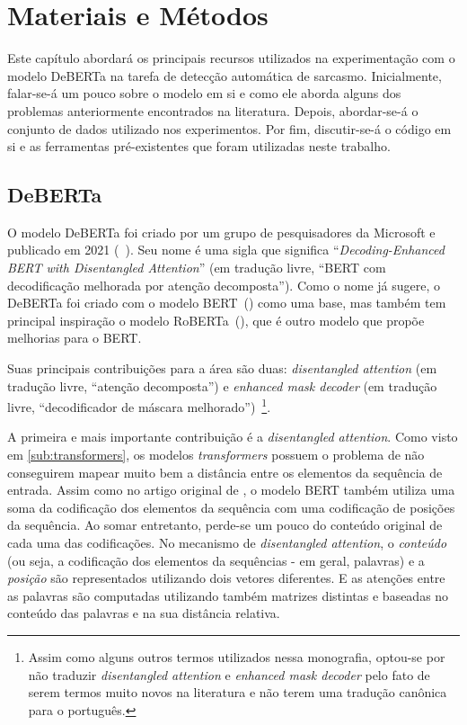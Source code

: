 

\chapter{Materiais e Métodos}%
\label{cha:materiais_e_metodos}

Este capítulo abordará os principais recursos utilizados na experimentação com o
modelo DeBERTa na tarefa de detecção automática de sarcasmo. Inicialmente,
falar-se-á um pouco sobre o modelo em si e como ele aborda alguns dos problemas
anteriormente encontrados na literatura. Depois, abordar-se-á o conjunto de
dados utilizado nos experimentos. Por fim, discutir-se-á o código em si e as
ferramentas pré-existentes que foram utilizadas neste trabalho.

\section{DeBERTa}%
\label{sec:deberta}

O modelo DeBERTa foi criado por um grupo de pesquisadores da Microsoft e
publicado em 2021 (~\cite{he-etal:2020:deberta}). Seu nome é uma sigla que
significa ``\textit{Decoding-Enhanced BERT with Disentangled Attention}'' (em
tradução livre, ``BERT com decodificação melhorada por atenção decomposta'').
Como o nome já sugere, o DeBERTa foi criado com o modelo
BERT~(\cite{devlin-etal:2018:bert}) como uma base, mas também tem principal
inspiração o modelo RoBERTa~(\cite{liu-etal:2019:roberta}), que é outro modelo
que propõe melhorias para o BERT.

Suas principais contribuições para a área são duas: \textit{disentangled
attention} (em tradução livre, ``atenção decomposta'') e \textit{enhanced mask
decoder} (em tradução livre, ``decodificador de máscara
melhorado'')~\footnote{Assim como alguns outros termos utilizados nessa
monografia, optou-se por não traduzir \textit{disentangled attention}
e \textit{enhanced mask decoder} pelo fato de serem termos muito novos na
literatura e não terem uma tradução canônica para o português.}.

A primeira e mais importante contribuição é a \textit{disentangled attention}.
Como visto em \ref{sub:transformers}, os modelos \textit{transformers} possuem
o problema de não conseguirem mapear muito bem a distância entre os elementos da
sequência de entrada. Assim como no artigo original de
\cite{vaswani-etal:2017:attention-is-all-you-need}, o modelo BERT também utiliza
uma soma da codificação dos elementos da sequência com uma codificação de
posições da sequência. Ao somar entretanto, perde-se um pouco do conteúdo
original de cada uma das codificações. No mecanismo de \textit{disentangled
attention}, o \textit{conteúdo} (ou seja, a codificação dos elementos da
sequências - em geral, palavras) e a \textit{posição} são representados
utilizando dois vetores diferentes. E as atenções entre as palavras são
computadas utilizando também matrizes distintas e baseadas no conteúdo das
palavras e na sua distância relativa.

